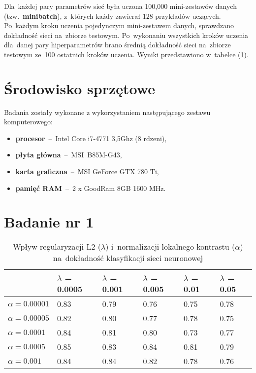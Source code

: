 Dla~każdej pary parametrów sieć była uczona 100,000 mini-zestawów danych (tzw.~\textbf{minibatch}), z~których
każdy zawierał 128 przykładów uczących. Po~każdym kroku uczenia pojedynczym mini-zestawem danych, sprawdzano
dokładność sieci na~zbiorze testowym. Po~wykonaniu wszystkich kroków uczenia dla~danej pary hiperparametrów
brano średnią dokładność sieci na~zbiorze testowym ze~100 ostatnich kroków uczenia. Wyniki przedstawiono w~tabelce
(\ref{table:wyniki1}).

\section{Środowisko sprzętowe}
Badania zostały wykonane z wykorzystaniem następującego zestawu komputerowego:
\begin{itemize}
    \item \textbf{procesor}~--~Intel Core i7-4771 3,5Ghz (8 rdzeni),
    \item \textbf{płyta główna}~--~MSI~B85M-G43,
    \item \textbf{karta graficzna}~--~MSI GeForce GTX 780 Ti,
    \item \textbf{pamięć RAM}~--~2 x GoodRam 8GB 1600 MHz.
\end{itemize}

\section{Badanie nr 1}
\begin{table}[H]
    \centering
    \begin{tabular}{|l|l|l|l|l|l|}
      \hline
                       & $\lambda$ = 0.0005 & $\lambda$ = 0.001 & $\lambda$ = 0.005 & $\lambda$ = 0.01 & $\lambda$ = 0.05 \\
      \hline
      $\alpha=0.00001$ & 0.83 & 0.79 & 0.76 & 0.75 & 0.78 \\
      \hline
      $\alpha=0.00005$ & 0.82 & 0.80 & 0.77 & 0.78 & 0.75 \\
      \hline
      $\alpha=0.0001$  & 0.84 & 0.81 & 0.80 & 0.73 & 0.77 \\
      \hline
      $\alpha=0.0005$  & 0.85 & 0.83 & 0.84 & 0.81 & 0.79 \\
      \hline
      $\alpha=0.001$   & 0.84 & 0.84 & 0.82 & 0.78 & 0.76 \\
      \hline
    \end{tabular}
    \caption{Wpływ regularyzacji L2 ($\lambda$) i~normalizacji lokalnego kontrastu ($\alpha$) na~dokładność klasyfikacji
    sieci neuronowej}
    \label{table:wyniki1}
\end{table}

